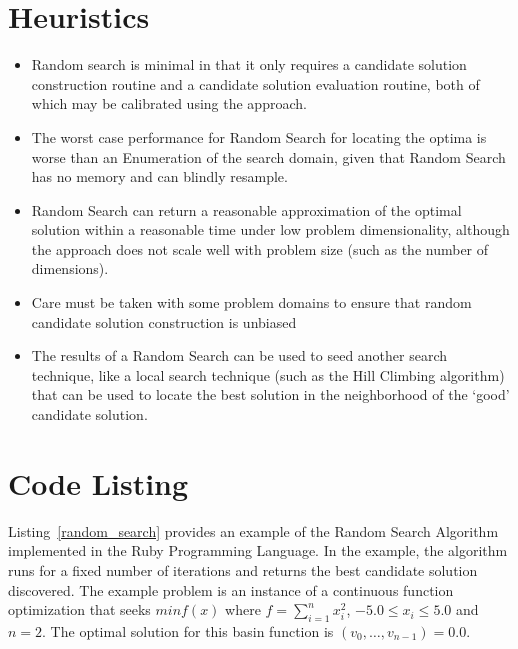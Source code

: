 \documentclass[a4paper, 11pt]{article}
\begin{document}
\section{Heuristics}
\label{sec:heuristics}
\begin{itemize}
	\item Random search is minimal in that it only requires a candidate solution construction routine and a candidate solution evaluation routine, both of which may be calibrated using the approach.
	\item The worst case performance for Random Search for locating the optima is worse than an Enumeration of the search domain, given that Random Search has no memory and can blindly resample.
	\item Random Search can return a reasonable approximation of the optimal solution within a reasonable time under low problem dimensionality, although the approach does not scale well with problem size (such as the number of dimensions).
	\item Care must be taken with some problem domains to ensure that random candidate solution construction is  unbiased
	\item The results of a Random Search can be used to seed another search technique, like a local search technique (such as the Hill Climbing algorithm) that can be used to locate the best solution in the neighborhood of the `good' candidate solution.
\end{itemize}

\section{Code Listing}
\label{sec:code}
Listing~\ref{random_search} provides an example of the Random Search Algorithm implemented in the Ruby Programming Language. 
In the example, the algorithm runs for a fixed number of iterations and returns the best candidate solution discovered. 
The example problem is an instance of a continuous function optimization that seeks $min f(x)$ where $f=\sum_{i=1}^n x_{i}^2$, $-5.0\leq x_i \leq 5.0$ and $n=2$. The optimal solution for this basin function is $(v_0,\ldots,v_{n-1})=0.0$.
\end{document}
